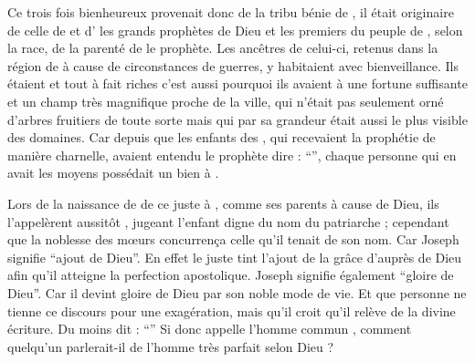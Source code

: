 \saut

Ce trois fois bienheureux provenait donc de la tribu bénie de , 
il était originaire de celle de  et d' %
les grands prophètes de Dieu et les premiers du peuple de ,
selon la race, de la parenté de  le prophète. 
Les ancêtres de celui-ci, retenus dans la région de  à cause de circonstances de guerres, %
y habitaient avec bienveillance. %
Ils étaient  et tout à fait riches
 c'est aussi pourquoi ils avaient à  une fortune suffisante et un  champ très magnifique proche de la ville, qui n'était pas seulement orné d'arbres fruitiers de toute sorte%
mais qui par sa grandeur était aussi  le plus visible des domaines.
Car depuis que les enfants des , qui recevaient la prophétie de manière charnelle, avaient entendu le prophète   dire : \enquote{}, chaque personne qui en avait les moyens possédait un bien à .

Lors de la naissance de de ce juste à , comme ses parents   à cause de Dieu, 
ils l'appelèrent aussitôt , jugeant l'enfant digne du nom du patriarche ; 
cependant que la noblesse des mœurs concurrença celle qu'il tenait de son nom.
Car Joseph signifie \enquote{ajout de Dieu}.
En effet le juste tint l'ajout de la grâce d'auprès de Dieu afin qu'il atteigne la perfection apostolique.
Joseph signifie également \enquote{gloire de Dieu}. %
Car il devint gloire de Dieu par son noble mode de vie.
Et que personne ne tienne ce discours pour une  exagération, 
mais qu'il croit qu'il relève de la divine écriture.
Du moins  dit : \enquote{}
Si donc  appelle l'homme commun , comment quelqu'un parlerait-il de l'homme très parfait selon Dieu ?

